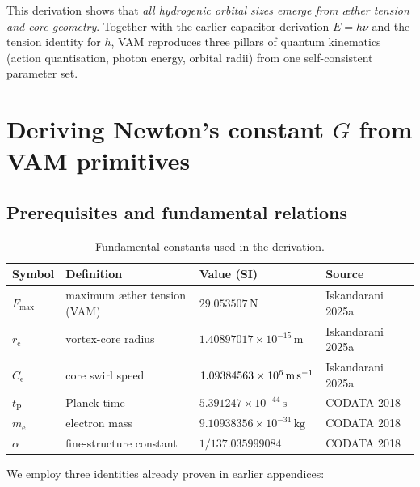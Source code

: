\documentclass[a4paper,12pt]{article}
\begin{document}
This derivation shows that \textit{all hydrogenic orbital sizes emerge from æther tension and core geometry}. Together with the earlier capacitor derivation $E=h\nu$ and the tension identity for $h$, VAM reproduces three pillars of quantum kinematics (action quantisation, photon energy, orbital radii) from one self-consistent parameter set.


\section{Deriving Newton's constant $G$ from VAM primitives}

\subsection{Prerequisites and fundamental relations}

\begin{table}[h]
    \centering
    \begin{tabular}{llll}
        \toprule
        \textbf{Symbol} & \textbf{Definition} & \textbf{Value (SI)} & \textbf{Source} \\
        \midrule
        $F_{\max}$ & maximum æther tension (VAM) & $29.053507\,\text{N}$ & Iskandarani 2025a~\cite{Iskandarani2025a} \\
        $r_{\mathrm{c}}$ & vortex-core radius & $1.40897017\times10^{-15}\,\text{m}$ & Iskandarani 2025a~\cite{Iskandarani2025a} \\
        $C_{\mathrm{e}}$ & core swirl speed & $1.09384563\times10^{6}\,\text{m\,s}^{-1}$ & Iskandarani 2025a~\cite{Iskandarani2025a} \\
        $t_{\mathrm{P}}$ & Planck time & $5.391247\times10^{-44}\,\text{s}$ & CODATA 2018~\cite{CODATA2018} \\
        $m_{\mathrm{e}}$ & electron mass & $9.10938356\times10^{-31}\,\text{kg}$ & CODATA 2018~\cite{CODATA2018} \\
        $\alpha$ & fine-structure constant & $1/137.035999084$ & CODATA 2018~\cite{CODATA2018} \\
        \bottomrule
    \end{tabular}
    \caption{Fundamental constants used in the derivation.}
    \label{tab:constants}
\end{table}

We employ three identities already proven in earlier appendices:
\end{document}
